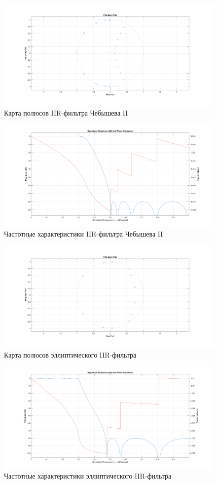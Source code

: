 \documentclass[12pt,a4paper]{article}
\begin{document}
	
	\begin{figure}[H]
		\centering
		\includegraphics[width=1.0\linewidth]{res/5_2_cheb2_poles.png}
		\caption{Карта полюсов IIR-фильтра Чебышева II}
	\end{figure}
	
	\begin{figure}[H]
		\centering
		\includegraphics[width=1.0\linewidth]{res/5_2_cheb2_ach.png}
		\caption{Частотные характеристики IIR-фильтра Чебышева II}
	\end{figure}

	
	\begin{figure}[H]
		\centering
		\includegraphics[width=1.0\linewidth]{res/5_2_ellp_poles.png}
		\caption{Карта полюсов эллиптического IIR-фильтра}
	\end{figure}
	
	\begin{figure}[H]
		\centering
		\includegraphics[width=1.0\linewidth]{res/5_2_ellp_ach.png}
		\caption{Частотные характеристики эллиптического IIR-фильтра}
	\end{figure}
	
\end{document}
